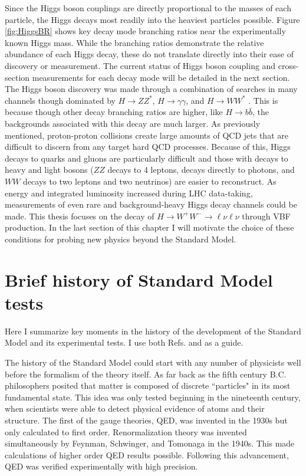 Since the Higgs boson couplings are directly proportional to the masses of each particle, the Higgs decays most readily into the heaviest particles possible. Figure \ref{fig:HiggsBR} shows key decay mode branching ratios near the experimentally known Higgs mass. While the branching ratios demonstrate the relative abundance of each Higgs decay, these do not translate directly into their ease of discovery or measurement. The current status of Higgs boson coupling and cross-section measurements for each decay mode will be detailed in the next section. The Higgs boson discovery was made through a combination of searches in many channels though dominated by $H\rightarrow ZZ^*$, $H\rightarrow\gamma\gamma$, and $H\rightarrow WW^*$ \cite{Higgsdiscovery}. This is because though other decay branching ratios are higher, like $H\rightarrow b\bar{b}$, the backgrounds associated with this decay are much larger. As previously mentioned, proton-proton collisions create large amounts of QCD jets that are difficult to discern from any target hard QCD processes. Because of this, Higgs decays to quarks and gluons are particularly difficult and those with decays to heavy and light bosons ($ZZ$ decays to 4 leptons, decays directly to photons, and $WW$ decays to two leptons and two neutrinos) are easier to reconstruct. As energy and integrated luminosity increased during LHC data-taking, measurements of even rare and background-heavy Higgs decay channels could be made.  This thesis focuses on the decay of $H\rightarrow W^+W^-\rightarrow \ell\nu\ell\nu$ through VBF production. In the last section of this chapter I will motivate the choice of these conditions for probing new physics beyond the Standard Model.   

\section{Brief history of Standard Model tests}
Here I summarize key moments in the history of the development of the Standard Model and its experimental tests. I use both Refs. \cite{Kibble} and \cite{HistoryBook} as a guide.

The history of the Standard Model could start with any number of physicists well before the formalism of the theory itself. As far back as the fifth century B.C. philosophers posited that matter is composed of discrete ``particles" in its most fundamental state. This idea was only tested beginning in the nineteenth century, when scientists were able to detect physical evidence of atoms and their structure. The first of the gauge theories, QED, was invented in the 1930s but only calculated to first order. Renormalization theory was invented simultaneously by Feynman, Schwinger, and Tomonaga in the 1940s. This made calculations of higher order QED results possible. Following this advancement, QED was verified experimentally with high precision. 

